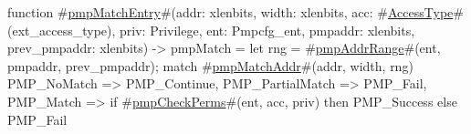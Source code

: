 function #\hyperref[sailRISCVzpmpMatchEntry]{pmpMatchEntry}#(addr: xlenbits, width: xlenbits, acc: #\hyperref[sailRISCVzAccessType]{AccessType}#(ext_access_type), priv: Privilege,
                       ent: Pmpcfg_ent, pmpaddr: xlenbits, prev_pmpaddr: xlenbits) -> pmpMatch = {
  let rng = #\hyperref[sailRISCVzpmpAddrRange]{pmpAddrRange}#(ent, pmpaddr, prev_pmpaddr);
  match #\hyperref[sailRISCVzpmpMatchAddr]{pmpMatchAddr}#(addr, width, rng) {
    PMP_NoMatch      => PMP_Continue,
    PMP_PartialMatch => PMP_Fail,
    PMP_Match        => if   #\hyperref[sailRISCVzpmpCheckPerms]{pmpCheckPerms}#(ent, acc, priv)
                        then PMP_Success
                        else PMP_Fail
  }
}
